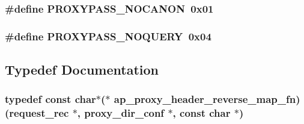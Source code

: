 \subsubsection[{\texorpdfstring{P\+R\+O\+X\+Y\+P\+A\+S\+S\+\_\+\+N\+O\+C\+A\+N\+ON}{PROXYPASS_NOCANON}}]{\setlength{\rightskip}{0pt plus 5cm}\#define P\+R\+O\+X\+Y\+P\+A\+S\+S\+\_\+\+N\+O\+C\+A\+N\+ON~0x01}\hypertarget{group__MOD__PROXY_ga68eff5a895dcf8ab40078745e3160b6a}{}\label{group__MOD__PROXY_ga68eff5a895dcf8ab40078745e3160b6a}
\subsubsection[{\texorpdfstring{P\+R\+O\+X\+Y\+P\+A\+S\+S\+\_\+\+N\+O\+Q\+U\+E\+RY}{PROXYPASS_NOQUERY}}]{\setlength{\rightskip}{0pt plus 5cm}\#define P\+R\+O\+X\+Y\+P\+A\+S\+S\+\_\+\+N\+O\+Q\+U\+E\+RY~0x04}\hypertarget{group__MOD__PROXY_gabe5fec84c97375731569cb19d336a98e}{}\label{group__MOD__PROXY_gabe5fec84c97375731569cb19d336a98e}


\subsection{Typedef Documentation}
\subsubsection[{\texorpdfstring{ap\+\_\+proxy\+\_\+header\+\_\+reverse\+\_\+map\+\_\+fn}{ap_proxy_header_reverse_map_fn}}]{\setlength{\rightskip}{0pt plus 5cm}typedef const char$\ast$($\ast$ ap\+\_\+proxy\+\_\+header\+\_\+reverse\+\_\+map\+\_\+fn) ({\bf request\+\_\+rec} $\ast$, {\bf proxy\+\_\+dir\+\_\+conf} $\ast$, const char $\ast$)}\hypertarget{group__MOD__PROXY_gacba8ab0ab8510a98dd6d1f8a1b2cc594}{}\label{group__MOD__PROXY_gacba8ab0ab8510a98dd6d1f8a1b2cc594}
